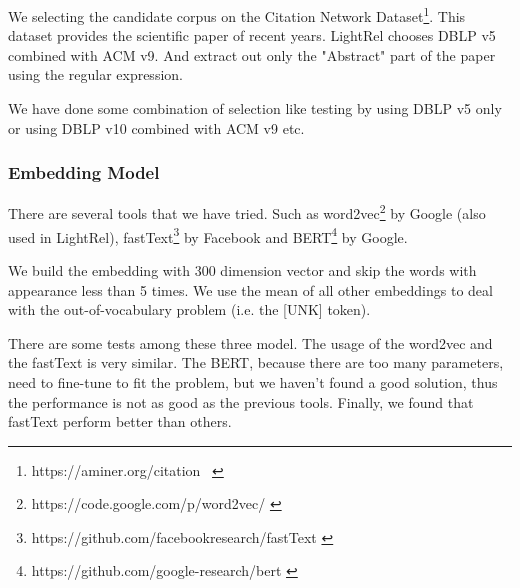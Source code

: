 We selecting the candidate corpus on the Citation Network Dataset\footnote{https://aminer.org/citation ~\cite{Tang:08KDD}}. This dataset provides the scientific paper of recent years. LightRel chooses DBLP  v5 combined with ACM v9. And extract out only the "Abstract" part of the paper using the regular expression.

We have done some combination of selection like testing by using DBLP v5 only or using DBLP v10 combined with ACM v9 etc.

\subsubsection{Embedding Model}
\label{sec:embedding_model}

There are several tools that we have tried. Such as word2vec\footnote{https://code.google.com/p/word2vec/ \cite{NIPS2013_5021}} by Google (also used in LightRel), fastText\footnote{https://github.com/facebookresearch/fastText \cite{bojanowski2017enriching}} by Facebook and BERT\footnote{https://github.com/google-research/bert \cite{devlin2018bert}} by Google.

We build the embedding with 300 dimension vector and skip the words with appearance less than 5 times. We use the mean of all other embeddings to deal with the out-of-vocabulary problem (i.e. the [UNK] token).

There are some tests among these three model. The usage of the word2vec and the fastText is very similar. The BERT, because there are too many parameters, need to fine-tune to fit the problem, but we haven't found a good solution, thus the performance is not as good as the previous tools. Finally, we found that fastText perform better than others.